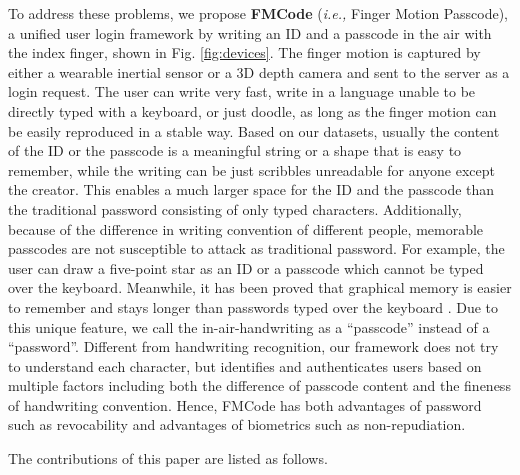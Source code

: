 \documentclass[conference]{IEEEtran}
\begin{document}
To address these problems, we propose \textbf{FMCode} (\textit{i.e.,} Finger Motion Passcode), a unified user login framework by writing an ID and a passcode in the air with the index finger, shown in Fig. \ref{fig:devices}. The finger motion is captured by either a wearable inertial sensor or a 3D depth camera and sent to the server as a login request. The user can write very fast, write in a language unable to be directly typed with a keyboard, or just doodle, as long as the finger motion can be easily reproduced in a stable way. Based on our datasets, usually the content of the ID or the passcode is a meaningful string or a shape that is easy to remember, while the writing can be just scribbles unreadable for anyone except the creator. This enables a much larger space for the ID and the passcode than the traditional password consisting of only typed characters. Additionally, because of the difference in writing convention of different people, memorable passcodes are not susceptible to attack as traditional password. For example, the user can draw a five-point star as an ID or a passcode which cannot be typed over the keyboard. Meanwhile, it has been proved that graphical memory is easier to remember and stays longer than passwords typed over the keyboard \cite{GPass}. Due to this unique feature, we call the in-air-handwriting as a ``passcode'' instead of a ``password''. Different from handwriting recognition, our framework does not try to understand each character, but identifies and authenticates users based on multiple factors including both the difference of passcode content and the fineness of handwriting convention. Hence, FMCode has both advantages of password such as revocability and advantages of biometrics such as non-repudiation. 



The contributions of this paper are listed as follows.
\end{document}
